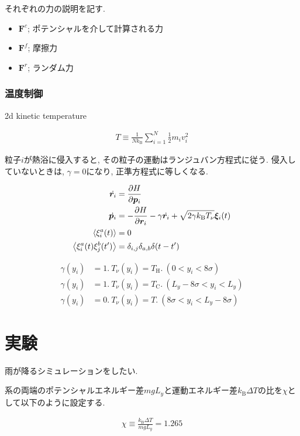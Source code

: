 \documentclass[dvipdfmx]{jsarticle}
\numberwithin{equation}{subsection}
\begin{document}
それぞれの力の説明を記す.

\begin{itemize}
  \item $\bm{F}^c$; ポテンシャルを介して計算される力
  \item $\bm{F}^f$; 摩擦力
  \item $\bm{F}^r$; ランダム力
\end{itemize}


\subsubsection{温度制御}


2d kinetic temperature

\begin{align}
  T \equiv \frac{1}{Nk_{\text{B}}}\sum_{i=1}^{N} \frac{1}{2}m_i v_{i}^2
\end{align}

粒子$i$が熱浴に侵入すると, その粒子の運動はランジュバン方程式に従う. 侵入していないときは, $\gamma = 0$になり, 正準方程式に等しくなる.

\begin{align}
  \dot{\bm{r}_i} &= \pdv{H}{\bm{p}_i} \\
  \dot{\bm{p}_i} &= - \pdv{H}{\bm{r}_i} - \gamma \dot{\bm{r}_i} + \sqrt{2 \gamma k_{\text{B}}T_{\nu}}\bm{\xi}_i (t) \\
  \expval{\xi_{i}^{a}(t)} &= 0 \\
  \expval{\xi_{i}^{a}(t)\xi_{j}^{b}(t')} &= \delta_{i,j} \delta_{a,b}\delta (t-t') 
\end{align}

\begin{align}
  \gamma(y_i) &= 1. \ T_{\nu}(y_i) = T_{\text{H}}. \ (0 < y_i < 8\sigma) \\
  \gamma(y_i) &= 1. \ T_{\nu}(y_i) = T_{\text{C}}. \ (L_y - 8\sigma < y_i < L_y) \\
  \gamma(y_i) &= 0. \ T_{\nu}(y_i) = T. \ (8\sigma < y_i < L_y - 8\sigma)
\end{align}

\section{実験}

雨が降るシミュレーションをしたい.

系の両端のポテンシャルエネルギー差$mgL_y$と運動エネルギー差$k_{\text{B}}\Delta T$の比を$\chi$として以下のように設定する.

\begin{align}
  \chi \equiv \frac{k_{\text{B}}\Delta T}{mgL_{y}} = 1.265
\end{align}
\end{document}
